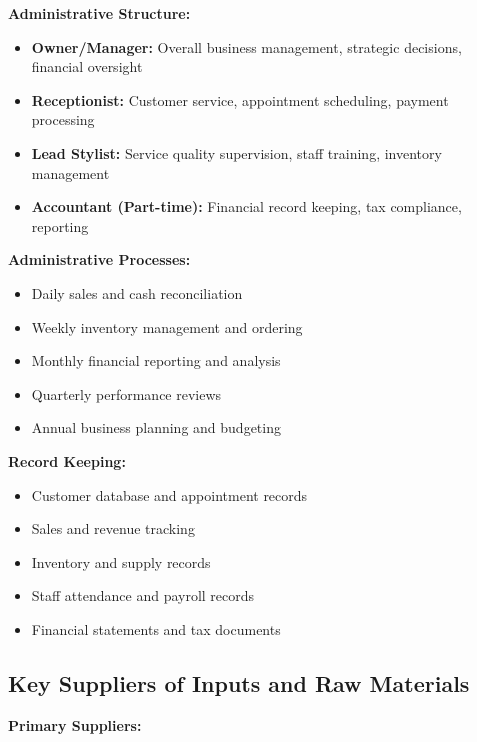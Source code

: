\textbf{Administrative Structure:}
\begin{itemize}[leftmargin=2em]
    \item \textbf{Owner/Manager:} Overall business management, strategic decisions, financial oversight
    \item \textbf{Receptionist:} Customer service, appointment scheduling, payment processing
    \item \textbf{Lead Stylist:} Service quality supervision, staff training, inventory management
    \item \textbf{Accountant (Part-time):} Financial record keeping, tax compliance, reporting
\end{itemize}

\textbf{Administrative Processes:}
\begin{itemize}[leftmargin=2em]
    \item Daily sales and cash reconciliation
    \item Weekly inventory management and ordering
    \item Monthly financial reporting and analysis
    \item Quarterly performance reviews
    \item Annual business planning and budgeting
\end{itemize}

\textbf{Record Keeping:}
\begin{itemize}[leftmargin=2em]
    \item Customer database and appointment records
    \item Sales and revenue tracking
    \item Inventory and supply records
    \item Staff attendance and payroll records
    \item Financial statements and tax documents
\end{itemize}

\subsection{Key Suppliers of Inputs and Raw Materials}

\textbf{Primary Suppliers:}

